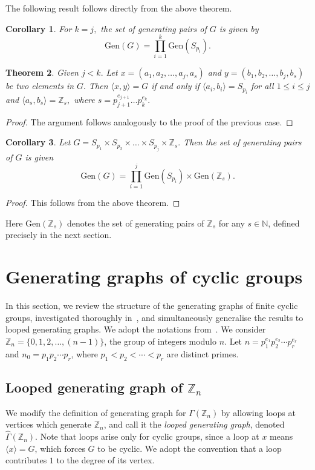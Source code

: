 \documentclass[11pt]{article}
\def \N {{\mathbb N}}
\def \Z {{\mathbb Z}}
\newtheorem{theorem}{Theorem}[section]
\newtheorem{cor}[theorem]{Corollary}
\begin{document}
The following result follows directly from the above theorem.
\begin{cor}
    For $k=j,$ the set of generating pairs of $G$ is given by $$\mathrm{Gen}(G)=\prod_{i=1}^{k}\mathrm{Gen}(S_{p_i}).$$ 
\end{cor}

\begin{theorem}\label{thm:bgen}
    Given $j<k.$ Let $x=(a_1,a_2,\ldots ,a_j,a_s)$ and $y=(b_1,b_2,\ldots, b_j,b_s)$ be two elements in $G.$
    Then  $\langle x,y\rangle=G$ if and only if $\langle a_i,b_i\rangle=S_{p_i}$ for all $1\leq i\leq j$ and $\langle a_s,b_s \rangle=\Z_s,$ where $s=p_{j+1}^{e_{j+1}}\dots p_k^{e_k}.$ 
\end{theorem}
\begin{proof}
    The argument follows analogously to the proof of the previous case.
\end{proof}
\begin{cor}
    Let $G=S_{p_1}\times  S_{p_2}\times  \dots\times  S_{p_j}\times  \Z_{s}.$  Then  the set of generating pairs of $G$ is given  $$\mathrm{Gen}(G)=\prod\limits_{i=1}^{j}\mathrm{Gen}(S_{p_i})\times \mathrm{Gen}(\Z_s).$$
\end{cor}
\begin{proof}
    This follows from the above theorem.
\end{proof}
Here $\mathrm{Gen}(\mathbb{Z}_s)$ denotes the set of generating pairs 
of $\mathbb{Z}_s$ for any $s\in \N$, defined precisely in the next section.

\section{Generating graphs of cyclic groups}\label{sec:4}
In this section, we review the structure of the generating graphs of 
finite cyclic groups, investigated thoroughly in~\cite{Me}, and 
simultaneously generalise the results to looped generating graphs. We 
adopt the notations from~\cite{Me}. We consider $\Z_n = \{0, 1, 2, 
\dots, (n-1)\}$, the group of integers modulo $n$. Let $n = p_1^{e_1} 
p_2^{e_2} \cdots p_r^{e_r}$ and $n_0 = p_1 p_2 \cdots p_r$, where 
$p_1 < p_2 < \cdots < p_r$ are distinct primes. 

\subsection{Looped generating graph of $\mathbb{Z}_n$}

We modify the definition of generating graph for $\Gamma(\Z_n)$ by allowing loops at 
vertices which generate $\Z_n$, and call it the \emph{looped generating 
graph}, denoted $\widehat{\Gamma}(\Z_n)$. Note that loops arise only 
for cyclic groups, since a loop at $x$ means $\langle x \rangle = G$, 
which forces $G$ to be cyclic. We adopt the convention that a loop 
contributes $1$ to the degree of its vertex.
\end{document}
